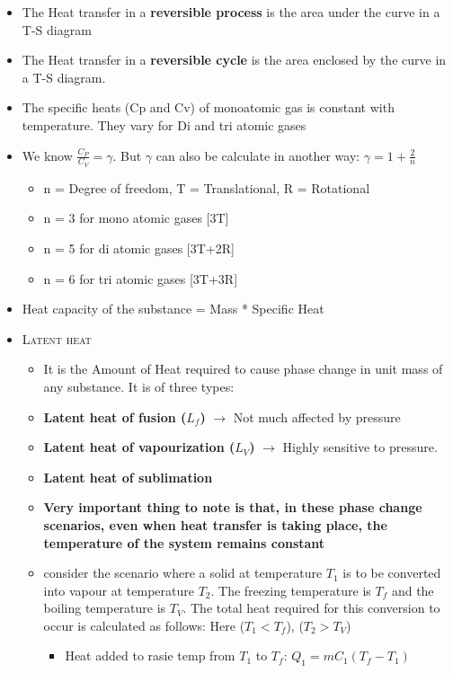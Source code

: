 \documentclass[8pt]{article}
\begin{document}
	\begin{itemize}
	\item The Heat transfer in a \textbf{reversible process} is the area under the curve in a T-S diagram
	\item The Heat transfer in a \textbf{ reversible cycle} is the area enclosed by the curve in a T-S diagram.
	\item The specific heats (Cp and Cv) of monoatomic gas is constant with temperature. They vary for Di and tri atomic gases
	\item We know $\boxed{\frac{C_P}{C_V}=\gamma}$. But $\gamma$ can also be calculate in another way: $\boxed{\gamma = 1+\frac{2}{n}}$
		\begin{itemize}
			\item n = Degree of freedom, T = Translational, R = Rotational
			\item n = 3 for mono atomic gases [3T]
			\item n = 5 for di atomic gases [3T+2R]
			\item n = 6 for tri atomic gases [3T+3R]
		\end{itemize}		 
	\item Heat capacity of the substance = Mass * Specific Heat
	\item \textsc{Latent heat}
		\begin{itemize}[wide]
			\item It is the Amount of Heat required to cause phase change in unit mass of any substance. It is of three types:
			\item \textbf{Latent heat of fusion ($L_f$)} $\rightarrow$ Not much affected by pressure
			\item \textbf{Latent heat of vapourization ($L_V$)} $\rightarrow$ Highly sensitive to pressure.
			\item \textbf{Latent heat of sublimation}
			\item \textbf{Very important thing to note is that, in these phase change scenarios, even when heat transfer is taking place, the temperature of the system remains constant}
			\item consider the scenario where a solid at temperature $T_1$ is to be converted into vapour at temperature $T_2$. The freezing temperature is $T_f$ and the boiling temperature is $T_V$. The total heat required for this conversion to occur is calculated as follows: Here ($T_1 < T_f$), ($T_2 > T_V$)
			\begin{itemize}
				\item Heat added to rasie temp from $T_1$ to $T_f$: $\boxed{Q_1 = mC_1(T_f-T_1)}$

\end{itemize}
\end{itemize}
\end{itemize}
\end{document}
